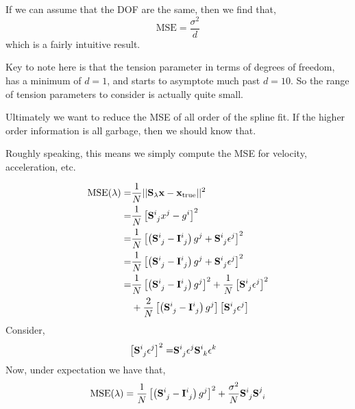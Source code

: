 \documentclass[10pt,journal]{IEEEtran}
\begin{document}
If we can assume that the DOF are the same, then we find that,
\begin{equation}
    \textrm{MSE} = \frac{\sigma^2}{d}
\end{equation}
which is a fairly intuitive result.

Key to note here is that the tension parameter in terms of degrees of freedom, has a minimum of $d=1$, and starts to asymptote much past $d=10$. So the range of tension parameters to consider is actually quite small.

Ultimately we want to reduce the MSE of all order of the spline fit. If the higher order information is all garbage, then we should know that.

Roughly speaking, this means we simply compute the MSE for velocity, acceleration, etc.

\begin{align}
    \textrm{MSE}(\lambda) =& \frac{1}{N} || \mathbf{S_\lambda}\mathbf{x} - \mathbf{x}_{\textrm{true}} ||^2 \\
    =& \frac{1}{N} \left[ \mathbf{S}\indices{^i_j} x^j - g^i \right]^2 \\
    =& \frac{1}{N} \left[ \left(\mathbf{S}\indices{^i_j} -\mathbf{I}\indices{^i_j} \right) g^j + \mathbf{S}\indices{^i_j} \epsilon^j \right]^2 \\
    =& \frac{1}{N} \left[ \left(\mathbf{S}\indices{^i_j} -\mathbf{I}\indices{^i_j} \right) g^j + \mathbf{S}\indices{^i_j} \epsilon^j \right]^2 \\ \nonumber
    =& \frac{1}{N} \left[ \left(\mathbf{S}\indices{^i_j} -\mathbf{I}\indices{^i_j} \right) g^j  \right]^2  + \frac{1}{N} \left[ \mathbf{S}\indices{^i_j} \epsilon^j \right]^2\\
    & +\frac{2}{N} \left[ \left(\mathbf{S}\indices{^i_j} -\mathbf{I}\indices{^i_j} \right) g^j  \right] \left[ \mathbf{S}\indices{^i_j} \epsilon^j \right]
\end{align}
Consider,
\begin{align}
    \left[\mathbf{S}\indices{^i_j} \epsilon^j\right]^2 =& \mathbf{S}\indices{^i_j} \epsilon^j \mathbf{S}\indices{^i_k} \epsilon^k
\end{align}
Now, under expectation we have that,
\begin{equation}
    \textrm{MSE}(\lambda) = \frac{1}{N} \left[ \left(\mathbf{S}\indices{^i_j} -\mathbf{I}\indices{^i_j} \right) g^j  \right]^2  + \frac{\sigma^2}{N} \mathbf{S}\indices{^i_j} \mathbf{S}\indices{^j_i}
\end{equation}
\end{document}
